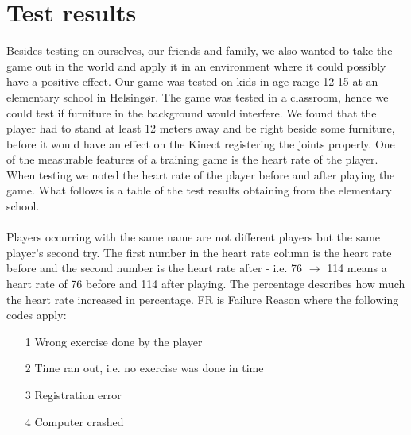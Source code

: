 \documentclass[11pt]{report}
\begin{document}

\section{Test results}
Besides testing on ourselves, our friends and family, we also wanted to take the game out in the world and apply it in an environment where it could possibly have a positive effect. Our game was tested on kids in age range 12-15 at an elementary school in Helsing\o r. The game was tested in a classroom, hence we could test if furniture in the background would interfere. We found that the player had to stand at least 12 meters away and be right beside some furniture, before it would have an effect on the Kinect registering the joints properly. One of the measurable features of a training game is the heart rate of the player. When testing we noted the heart rate of the player before and after playing the game. What follows is a table of the test results obtaining from the elementary school.\\
\\
Players occurring with the same name are not different players but the same player's second try. The first number in the heart rate column is the heart rate before and the second number is the heart rate after - i.e. 76 $\rightarrow$ 114 means a heart rate of 76 before and 114 after playing. The percentage describes how much the heart rate increased in percentage. FR is Failure Reason where the following codes apply:
\begin{itemize}
\item[1] Wrong exercise done by the player
\item[2] Time ran out, i.e. no exercise was done in time
\item[3] Registration error
\item[4] Computer crashed
\end{itemize}
\end{document}
